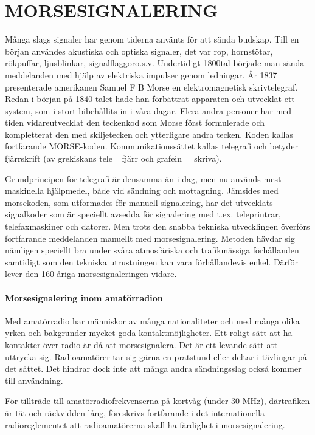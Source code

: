 
\part{MORSESIGNALERING}

Många slags signaler har genom tiderna använts för att sända budskap. Till en början
användes akustiska och optiska signaler, det var rop, hornstötar, rökpuffar, ljusblinkar,
signalflaggoro.s.v. Undertidigt 1800tal började man sända meddelanden med hjälp av
elektriska impulser genom ledningar. År 1837 presenterade amerikanen Samuel
F B Morse en elektromagnetisk skrivtelegraf. Redan i början på 1840-talet hade han
förbättrat apparaten och utvecklat ett system, som i stort bibehållits in i våra dagar.
Flera andra personer har med tiden vidareutvecklat den teckenkod som Morse först
formulerade och kompletterat den med skiljetecken och ytterligare andra tecken. Koden
kallas fortfarande MORSE-koden. Kommunikationssättet kallas telegrafi och betyder
fjärrskrift (av grekiskans tele= fjärr och grafein = skriva).

Grundprincipen för telegrafi är densamma än i dag, men nu används mest maskinella
hjälpmedel, både vid sändning och mottagning. Jämsides med morsekoden, som utformades för
manuell signalering, har det utvecklats signalkoder som är speciellt avsedda för
signalering med t.ex. teleprintrar, telefaxmaskiner och datorer. Men trots den snabba
tekniska utvecklingen överförs fortfarande meddelanden manuellt med morsesignalering.
Metoden hävdar sig nämligen speciellt bra under svåra atmosfäriska och trafikmässiga
förhållanden samtidigt som den tekniska utrustningen kan vara förhållandevis enkel.
Därför lever den 160-åriga morsesignaleringen vidare.

\subsection{Morsesignalering inom amatörradion}

Med amatörradio har människor av många nationaliteter och med många olika yrken
och bakgrunder mycket goda kontaktmöjligheter. Ett roligt sätt att ha kontakter över
radio är då att morsesignalera. Det är ett levande sätt att uttrycka sig. Radioamatörer
tar sig gärna en pratstund eller deltar i tävlingar på det sättet. Det hindrar dock inte
att många andra sändningsslag också kommer till användning.

För tillträde till amatörradiofrekvenserna på kortvåg (under 30 MHz), därtrafiken är tät
och räckvidden lång, föreskrivs fortfarande i det internationella radioreglementet att
radioamatörerna skall ha färdighet i morsesignalering.

